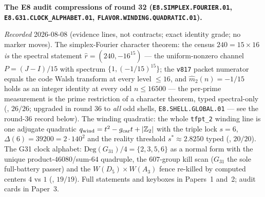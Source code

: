 \documentclass[11pt,a4paper]{article}
\newcommand{\gcar}{g_{\mathrm{car}}}
\newcommand{\Z}{\mathbb Z}
\begin{document}
\par\smallskip\noindent\textbf{The E8 audit compressions of
round 32 (\texttt{E8.SIMPLEX.FOURIER.01},
\texttt{E8.G31.CLOCK\_ALPHABET.01},
\texttt{FLAVOR.WINDING.QUADRATIC.01}).}
{\sloppy
\emph{Recorded} 2026-08-08 (evidence lines, not contracts;
exact identity grade; no marker moves).  The simplex-Fourier
character theorem: the census $240 = 15\times16$ \emph{is} the
spectral statement $\hat r = (240, -16^{15})$ --- the
uniform-nonzero channel $P = (J - I)/15$ with spectrum $\{1,
(-1/15)^{15}\}$; the \texttt{v817} packet numerator equals the
code Walsh transform at every level $\le 16$, and
$\hat m_2(n) = -1/15$ holds as an integer identity at every odd
$n \le 16500$ --- the per-prime measurement is the prime
restriction of a character theorem, typed spectral-only
(, $26/26$; upgraded in
round 36 to \emph{all} odd shells, \texttt{E8.SHELL.GLOBAL.01}
--- see the round-36 record below).  The
winding quadratic: the whole \texttt{tfpt\_2} winding line is
one adjugate quadratic $q_{\rm wind} = t^2 - \gcar t + |\Z_2|$
with the triple lock $s = 6$, $\Delta(6) = 39200 = 2\cdot140^2$
and the reality threshold $s^* \approx 2.8250$ typed
(, $20/20$).  The G31
clock alphabet: $\mathrm{Deg}(G_{31})/4 = \{2,3,5,6\}$ as a
normal form with the unique product-$46080$/sum-$64$ quadruple,
the $607$-group kill scan ($G_{31}$ the sole full-battery
passer) and the $W(D_5)\times W(A_3)$ fence re-killed by
computed centers $4$ vs $1$
(, $19/19$).  Full
statements and keyboxes in Papers~1 and~2; audit cards in
Paper~3.\par}
\end{document}
